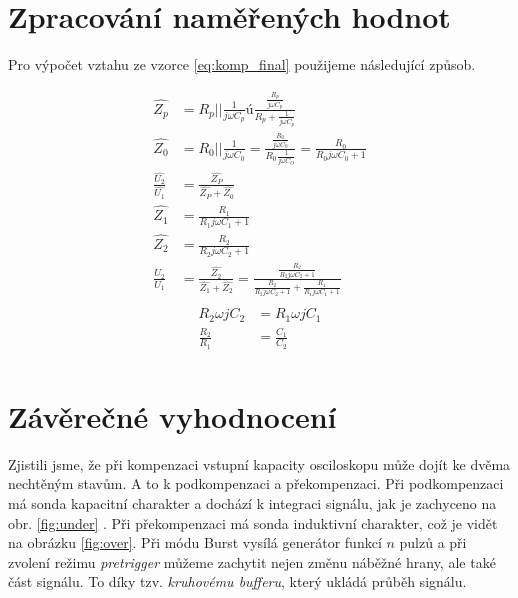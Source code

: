 \documentclass[a4paper,12pt]{article}   %
\begin{document}
\section{Zpracování naměřených hodnot}
\label{chap:zpracovani_hodnot}
Pro výpočet vztahu ze vzorce \ref{eq:komp_final} použijeme následující způsob.

\begin{equation}
  \begin{split}
    \hat{Z_p} &= R_p || \frac{1}{j\omega C_p} ú \frac{\frac{R_p}{j\omega C_p}}{R_p+\frac{1}{j \omega C_p}}\\
    \hat{Z_0} &= R_0 || \frac{1}{j\omega C_0} = \frac{\frac{R_0}{j\omega C_0}}{R_0\frac{1}{j\omega C_O}} = \frac{R_0}{R_0 j\omega C_0 +1}\\
    \frac{\hat{U_2}}{\hat{U_1}} &= \frac{\hat{Z_P}}{\hat{Z_P} + \hat{Z_0}}\\
    \hat{Z_1} &= \frac{R_1}{R_1 j\omega C_1 +1}\\
    \hat{Z_2} &= \frac{R_2}{R_2 j\omega C_2 +1}\\
    \frac{U_2}{U_1} &= \frac{\hat{Z_2}}{\hat{Z_1} + \hat{Z_2}} = \frac{\frac{R_2}{R_2 j\omega C_2 +1}}{\frac{R_2}{R_2 j\omega C_2 +1} + \frac{R_1}{R_1 j\omega C_1 +1}}\\
  \end{split}
\end{equation}
\begin{equation}
  \begin{split}
    R_2\omega j C_2 &= R_1 \omega j C_1\\
    \frac{R_2}{R_1} &= \frac{C_1}{C_2}\\
  \end{split}
\end{equation}


\section{Závěrečné vyhodnocení}
\label{chap:zaver}
Zjistili jsme, že při kompenzaci vstupní kapacity osciloskopu může dojít ke dvěma nechtěným stavům. A to k podkompenzaci a překompenzaci. Při podkompenzaci má sonda kapacitní charakter a dochází k integraci signálu, jak je zachyceno na obr. \ref{fig:under} . Při překompenzaci má sonda induktivní charakter, což je vidět na obrázku \ref{fig:over}. Při módu Burst vysílá generátor funkcí $n$ pulzů a při zvolení režimu \textit{pretrigger} můžeme zachytit nejen změnu náběžné hrany, ale také část signálu. To díky tzv. \textit{kruhovému bufferu}, který ukládá průběh signálu. 
\end{document}
